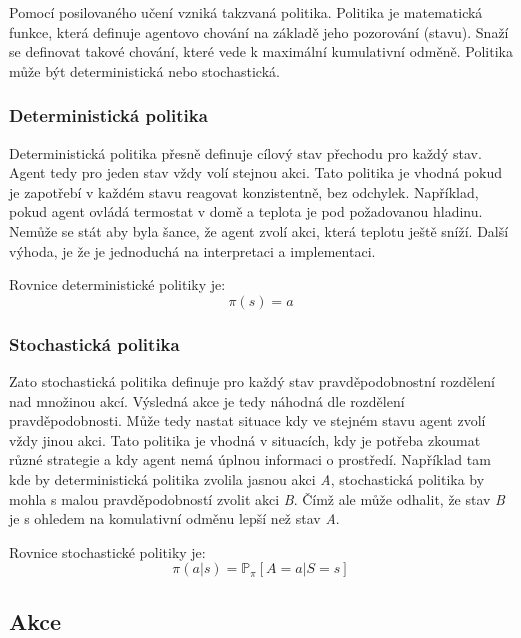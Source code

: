 Pomocí posilovaného učení vzniká takzvaná politika.
Politika je matematická funkce, která definuje agentovo chování na základě jeho pozorování (stavu).
Snaží se definovat takové chování, které vede k maximální kumulativní odměně.
Politika může být deterministická nebo stochastická.


  \subsubsection*{Deterministická politika}
  
  Deterministická politika přesně definuje cílový stav přechodu pro každý stav.
  Agent tedy pro jeden stav vždy volí stejnou akci.
  Tato politika je vhodná pokud je zapotřebí v každém stavu reagovat konzistentně, bez odchylek.
  Například, pokud agent ovládá termostat v domě a teplota je pod požadovanou hladinu.
  Nemůže se stát aby byla šance, že agent zvolí akci, která teplotu ještě sníží.
  Další výhoda, je že je jednoduchá na interpretaci a implementaci.\cite{Policies}

  Rovnice deterministické politiky je:
  \begin{equation}
    \pi(s) = a\label{eq:policy_deterministic}
  \end{equation}

  \subsubsection*{Stochastická politika}
  
  Zato stochastická politika definuje pro každý stav pravděpodobnostní rozdělení nad množinou akcí.
  Výsledná akce je tedy náhodná dle rozdělení pravděpodobnosti.
  Může tedy nastat situace kdy ve stejném stavu agent zvolí vždy jinou akci.
  Tato politika je vhodná v situacích, kdy je potřeba zkoumat různé strategie a kdy agent nemá úplnou informaci o prostředí.
  Například tam kde by deterministická politika zvolila jasnou akci \textit{A}, stochastická politika by mohla  s malou pravděpodobností zvolit akci \textit{B}.
  Čímž ale může odhalit, že stav \textit{B} je s ohledem na komulativní odměnu lepší než stav \textit{A}.\cite{Policies}

  Rovnice stochastické politiky je:
  \begin{equation}
    \pi(a \vert s) = \mathbb{P}_\pi [A=a \vert S=s]\label{eq:policy_stochastic}
  \end{equation}

  \subsection{Akce}\label{subsec:akce}


